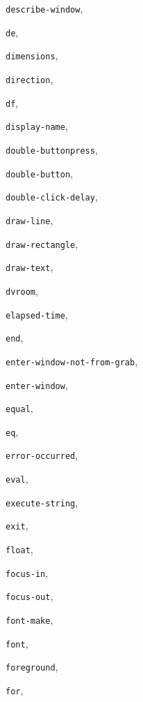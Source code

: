 \begin{theindex}
\item {\tt describe-window}, {\bf\pageref{describe-window}}
\item {\tt de}, {\bf\pageref{de}}
\item {\tt dimensions}, {\bf\pageref{dimensions}}
\item {\tt direction}, {\bf\pageref{direction}}
\item {\tt df}, {\bf\pageref{df}}
\item {\tt display-name}, {\bf\pageref{display-name}}
\item {\tt double-buttonpress}, {\bf\pageref{double-buttonpress}}
\item {\tt double-button}, {\bf\pageref{double-button}}
\item {\tt double-click-delay}, {\bf\pageref{double-click-delay}}
\item {\tt draw-line}, {\bf\pageref{draw-line}}
\item {\tt draw-rectangle}, {\bf\pageref{draw-rectangle}}
\item {\tt draw-text}, {\bf\pageref{draw-text}}
\item {\tt dvroom}, {\bf\pageref{dvroom}}
\item {\tt elapsed-time}, {\bf\pageref{elapsed-time}}
\item {\tt end}, {\bf\pageref{end}}
\item {\tt enter-window-not-from-grab}, {\bf\pageref{enter-window-not-from-grab}}
\item {\tt enter-window}, {\bf\pageref{enter-window}}
\item {\tt equal}, {\bf\pageref{equal}}
\item {\tt eq}, {\bf\pageref{eq}}
\item {\tt error-occurred}, {\bf\pageref{error-occurred}}
\item {\tt eval}, {\bf\pageref{eval}}
\item {\tt execute-string}, {\bf\pageref{execute-string}}
\item {\tt exit}, {\bf\pageref{exit}}
\item {\tt float}, {\bf\pageref{float}}
\item {\tt focus-in}, {\bf\pageref{focus-in}}
\item {\tt focus-out}, {\bf\pageref{focus-out}}
\item {\tt font-make}, {\bf\pageref{font-make}}
\item {\tt font}, {\bf\pageref{font}}
\item {\tt foreground}, {\bf\pageref{foreground}}
\item {\tt for}, {\bf\pageref{for}}

\end{theindex}
